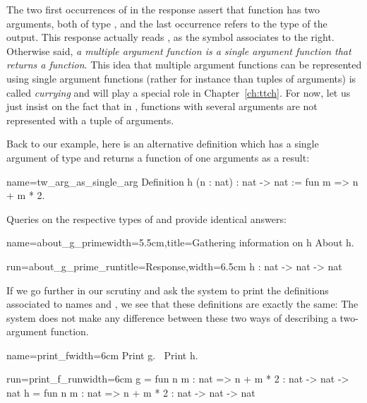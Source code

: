 The two first occurrences of  in the response
  assert that function  has two arguments,
 both of type , and the last occurrence refers to the type of
 the output. This response actually reads ,
 as the \C{->} symbol associates to the right. Otherwise said,
 {\em a multiple
 argument function is a single argument function that returns a
 function}.  This idea that multiple argument functions can be
represented using single argument functions (rather for instance than
tuples of arguments) is called {\em currying} and will play a special
role in Chapter~\ref{ch:ttch}. For now, let us just insist on the fact
that in \Coq{}, functions with several arguments are not represented
with a tuple of arguments.


Back to our example, here is an alternative definition
  which has a single argument  of type  and returns
 a function of one arguments as a result:

\begin{coq}{name=tw_arg_as_single_arg}{}
Definition h (n : nat) : nat -> nat := fun m => n + m * 2.
\end{coq}

Queries on the respective types of  and  provide identical answers:

\begin{coq}{name=about_g_prime}{width=5.5cm,title=Gathering information on h}
About h.
\end{coq}
\begin{coqout}{run=about_g_prime_run}{title=Response,width=6.5cm}
h : nat -> nat -> nat
\end{coqout}

If we go further in our scrutiny and ask the \Coq{} system to print
the definitions associated to names  and , we see that these
definitions are exactly the same: The \Coq{} system does not make any
difference between these two ways of describing a two-argument function.

\begin{coq}{name=print_f}{width=6cm}
Print g.
$~$
Print h.
$~$
\end{coq}
\begin{coqout}{run=print_f_run}{width=6cm}
g = fun n m : nat => n + m * 2
  : nat -> nat -> nat
h = fun n m : nat => n + m * 2
  : nat -> nat -> nat
\end{coqout}

